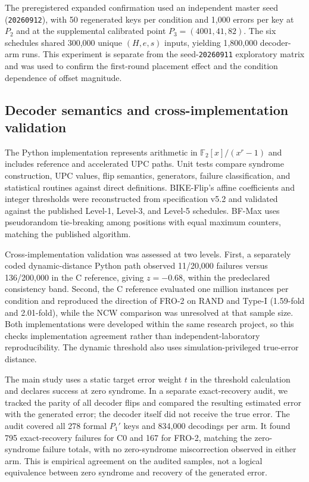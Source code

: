\documentclass[lettersize,journal]{IEEEtran}
\begin{document}
The preregistered expanded confirmation used an independent master seed (\texttt{20260912}), with 50 regenerated keys per condition and 1{,}000 errors per key at $P_2$ and at the supplemental calibrated point $P_3=(4001,41,82)$. The six schedules shared 300{,}000 unique $(H,e,s)$ inputs, yielding 1{,}800{,}000 decoder-arm runs. This experiment is separate from the seed-\texttt{20260911} exploratory matrix and was used to confirm the first-round placement effect and the condition dependence of offset magnitude.

\subsection{Decoder semantics and cross-implementation validation}

The Python implementation represents arithmetic in $\mathbb{F}_2[x]/(x^r-1)$ and includes reference and accelerated UPC paths. Unit tests compare syndrome construction, UPC values, flip semantics, generators, failure classification, and statistical routines against direct definitions. BIKE-Flip's affine coefficients and integer thresholds were reconstructed from specification v5.2 and validated against the published Level-1, Level-3, and Level-5 schedules. BF-Max uses pseudorandom tie-breaking among positions with equal maximum counters, matching the published algorithm.

Cross-implementation validation was assessed at two levels. First, a separately coded dynamic-distance Python path observed 11/20{,}000 failures versus 136/200{,}000 in the C reference, giving $z=-0.68$, within the predeclared consistency band. Second, the C reference evaluated one million instances per condition and reproduced the direction of FRO-2 on RAND and Type-I (1.59-fold and 2.01-fold), while the NCW comparison was unresolved at that sample size. Both implementations were developed within the same research project, so this checks implementation agreement rather than independent-laboratory reproducibility. The dynamic threshold also uses simulation-privileged true-error distance.

The main study uses a static target error weight $t$ in the threshold calculation and declares success at zero syndrome. In a separate exact-recovery audit, we tracked the parity of all decoder flips and compared the resulting estimated error with the generated error; the decoder itself did not receive the true error. The audit covered all 278 formal $P_1'$ keys and 834{,}000 decodings per arm. It found 795 exact-recovery failures for C0 and 167 for FRO-2, matching the zero-syndrome failure totals, with no zero-syndrome miscorrection observed in either arm. This is empirical agreement on the audited samples, not a logical equivalence between zero syndrome and recovery of the generated error.
\end{document}
